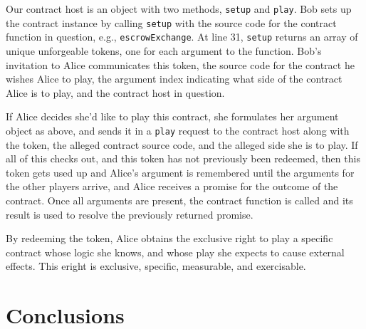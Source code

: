 \documentclass{llncs}
\begin{document}
Our contract host is an object with two methods, {\tt setup} and {\tt play}. Bob sets up the contract instance by calling {\tt setup} with the source code for the contract function in question, e.g., {\tt escrowExchange}. At line 31, {\tt setup} returns an array of unique unforgeable tokens, one for each argument to the function. Bob's invitation to Alice communicates this token, the source code for the contract he wishes Alice to play, the argument index indicating what side of the contract Alice is to play, and the contract host in question.

If Alice decides she'd like to play this contract, she formulates her argument object as above, and sends it in a {\tt play} request to the contract host along with the token, the alleged contract source code, and the alleged side she is to play. If all of this checks out, and this token has not previously been redeemed, then this token gets used up and Alice's argument is remembered until the arguments for the other players arrive, and Alice receives a promise for the outcome of the contract. Once all arguments are present, the contract function is called and its result is used to resolve the previously returned promise.

By redeeming the token, Alice obtains the exclusive right to play a specific contract whose logic she knows, and whose play she expects to cause external effects. This eright is exclusive, specific, measurable, and exercisable. 

\section{Conclusions}






% 

\end{document}
